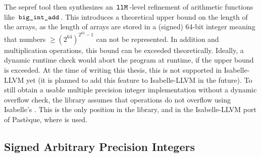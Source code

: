 The sepref tool then synthesizes an $\,\text{\ttfamily llM}\,$-level refinement of arithmetic functions like $\,\text{\ttfamily big\_int\_add}\,$.
This introduces a theoretical upper bound on the length of the arrays, as the length of arrays are stored in a (signed) 64-bit integer meaning that numbers $\geq (2^{64})^{2^{63}-1}$ can not be represented.
In addition and multiplication operations, this bound can be exceeded theoretically.
Ideally, a dynamic runtime check would abort the program at runtime, if the upper bound is exceeded.
At the time of writing this thesis, this is not supported in Isabelle-LLVM yet (it is planned to add this feature to Isabelle-LLVM in the future).
To still obtain a usable multiple precision integer implementation without a dynamic overflow check, the library assumes that operations do not overflow using Isabelle's .
This is the only position in the library, and in the Isabelle-LLVM port of Pastèque, where  is used.

\subsection{Signed Arbitrary Precision Integers}\label{sec:signed-arbitrary-precision-integers}

